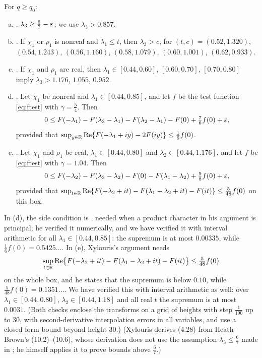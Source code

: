 \begin{inp}\label{inp:lambda3}
For $q\ge q_0$:
\begin{enumerate}[(a)]
  \item \cite[Lemma~10.3]{HeathBrown1992zero}. $\lambda_3\ge\frac67-\varepsilon$; we use $\lambda_3>0.857$.
  \item \cite[Table~8, column ``alle F\"alle'', p.~55]{Xylouris2011nullstellen}. If $\chi_1$ or $\rho_1$ is
    nonreal and $\lambda_1\le t$, then $\lambda_3>c$, for $(t,c)=(0.52,1.320)$, $(0.54,1.243)$,
    $(0.56,1.160)$, $(0.58,1.079)$, $(0.60,1.001)$, $(0.62,0.933)$.
  \item \cite[Lemma~4.4 and Table~10, p.~55]{Xylouris2011nullstellen}. If $\chi_1$ and $\rho_1$ are real, then
    $\lambda_1\in[0.44,0.60]$, $[0.60,0.70]$, $[0.70,0.80]$ imply $\lambda_3>1.176$, $1.055$, $0.952$.
  \item \cite[(4.28)--(4.29), pp.~56--57]{Xylouris2011nullstellen}. Let $\chi_1$ be nonreal and
    $\lambda_1\in[0.44,0.85]$, and let $f$ be the test function \eqref{eq:ftest} with $\gamma=\frac54$. Then
    \[
      0\le F(-\lambda_1)-F(\lambda_3-\lambda_1)-F(\lambda_2-\lambda_1)-F(0)+\tfrac76f(0)+\varepsilon,
    \]
    provided that $\sup_{y\in\mathbb{R}}\operatorname{Re}\{F(-\lambda_1+iy)-2F(iy)\}\le\frac16f(0)$.
  \item \cite[(4.31) and (4.34), pp.~58--59]{Xylouris2011nullstellen}. Let $\chi_1$ and $\rho_1$ be real,
    $\lambda_1\in[0.44,0.80]$ and $\lambda_2\in[0.44,1.176]$, and let $f$ be \eqref{eq:ftest} with
    $\gamma=1.04$. Then
    \[
      0\le F(-\lambda_2)-F(\lambda_3-\lambda_2)-F(0)-F(\lambda_1-\lambda_2)+\tfrac98f(0)+\varepsilon,
    \]
    provided that $\sup_{t\in\mathbb{R}}\operatorname{Re}\{F(-\lambda_2+it)-F(\lambda_1-\lambda_2+it)-F(it)\}\le\frac5{48}f(0)$ on this box.
\end{enumerate}
\end{inp}

In (d), the side condition is \cite[(4.29)]{Xylouris2011nullstellen}, needed when a product character in his argument
is principal; he verified it numerically, and we have verified it with interval arithmetic for
all $\lambda_1\in[0.44,0.85]$: the supremum is at most $0.00335$, while $\frac16f(0)=0.5425\ldots$. In (e),
Xylouris's argument \cite[(4.32)--(4.34), p.~59]{Xylouris2011nullstellen} needs
\[
  \sup_{t\in\mathbb{R}}\operatorname{Re}\bigl\{F(-\lambda_2+it)-F(\lambda_1-\lambda_2+it)-F(it)\bigr\}\le\tfrac5{48}f(0)
\]
on the whole box, and he states that the supremum is below $0.10$, while $\frac5{48}f(0)=0.1351\ldots$. We have
verified this with interval arithmetic as well: over $\lambda_1\in[0.44,0.80]$, $\lambda_2\in[0.44,1.18]$ and all real
$t$ the supremum is at most $0.0031$. (Both checks enclose the transforms on a grid of heights with
step $\frac1{100}$ up to $30$, with second-derivative interpolation errors in all variables, and use a
closed-form bound beyond height $30$.) (Xylouris derives (4.28) from Heath-Brown's (10.2)--(10.6), whose derivation does not use
the assumption $\lambda_3\le\frac67$ made in \cite[\S10]{HeathBrown1992zero}; he himself applies it to
prove bounds above $\frac67$.)

